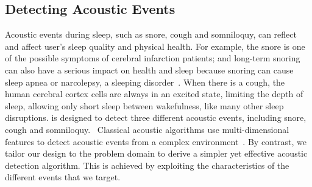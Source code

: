 \subsection{ Detecting Acoustic Events \label{sec:acoustic}}
Acoustic events during sleep, such as snore, cough and somniloquy, can reflect and affect user's sleep quality and physical health. For
example, the snore is one of the possible symptoms of cerebral infarction patients; and long-term snoring can also have a serious impact on
health and sleep because snoring can cause sleep apnea or narcolepsy, a sleeping disorder~\cite{snoring2016,snoring2013}. When there is a
cough, the human cerebral cortex cells are always in an excited state, limiting the depth of sleep, allowing only short sleep between
wakefulness, like many other sleep disruptions. {\systemname} is designed to detect three different acoustic events, including snore, cough
and somniloquy. \ Classical acoustic algorithms use multi-dimensional features to detect acoustic events from a complex
environment~\cite{gu2016sleep}. By contrast, we tailor our design to the problem domain to derive a simpler yet effective acoustic
detection algorithm. This is achieved by exploiting the characteristics of the different events that we target.


